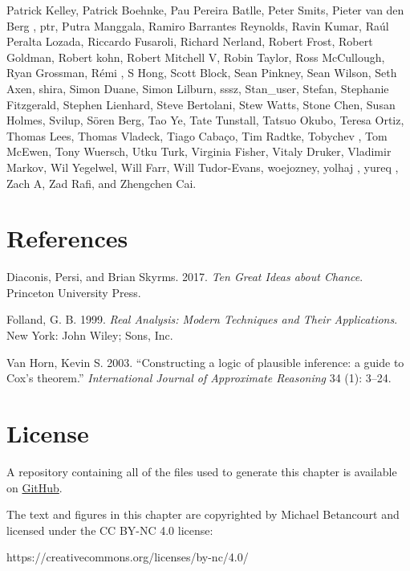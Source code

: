 \documentclass[
  letterpaper,
  DIV=11,
  numbers=noendperiod]{scrartcl}
\newlength{\cslhangindent}
\newlength{\cslentryspacingunit} %
\newenvironment{CSLReferences}[2] %
 {%
  \setlength{\parindent}{0pt}
  \ifodd #1
  \let\oldpar\par
  \def\par{\hangindent=\cslhangindent\oldpar}
  \fi
  \setlength{\parskip}{#2\cslentryspacingunit}
 }%
 {}
\begin{document}
Patrick Kelley, Patrick Boehnke, Pau Pereira Batlle, Peter Smits, Pieter
van den Berg , ptr, Putra Manggala, Ramiro Barrantes Reynolds, Ravin
Kumar, Raúl Peralta Lozada, Riccardo Fusaroli, Richard Nerland, Robert
Frost, Robert Goldman, Robert kohn, Robert Mitchell V, Robin Taylor,
Ross McCullough, Ryan Grossman, Rémi , S Hong, Scott Block, Sean
Pinkney, Sean Wilson, Seth Axen, shira, Simon Duane, Simon Lilburn,
sssz, Stan\_user, Stefan, Stephanie Fitzgerald, Stephen Lienhard, Steve
Bertolani, Stew Watts, Stone Chen, Susan Holmes, Svilup, Sören Berg, Tao
Ye, Tate Tunstall, Tatsuo Okubo, Teresa Ortiz, Thomas Lees, Thomas
Vladeck, Tiago Cabaço, Tim Radtke, Tobychev , Tom McEwen, Tony Wuersch,
Utku Turk, Virginia Fisher, Vitaly Druker, Vladimir Markov, Wil
Yegelwel, Will Farr, Will Tudor-Evans, woejozney, yolhaj , yureq , Zach
A, Zad Rafi, and Zhengchen Cai.

\hypertarget{references}{%
\section*{References}\label{references}}

\hypertarget{refs}{}
\begin{CSLReferences}{1}{0}
\leavevmode{}%
Diaconis, Persi, and Brian Skyrms. 2017. \emph{Ten Great Ideas about
Chance}. Princeton University Press.

\leavevmode{}%
Folland, G. B. 1999. \emph{Real Analysis: Modern Techniques and Their
Applications}. New York: John Wiley; Sons, Inc.

\leavevmode{}%
Van Horn, Kevin S. 2003. {``{Constructing a logic of plausible
inference: a guide to {C}ox's theorem}.''} \emph{{International Journal
of Approximate Reasoning}} 34 (1): 3--24.

\end{CSLReferences}

\hypertarget{license}{%
\section*{License}\label{license}}

A repository containing all of the files used to generate this chapter
is available on
\href{https://github.com/betanalpha/quarto_chapters/tree/main/4_probability_on_general_spaces}{GitHub}.

The text and figures in this chapter are copyrighted by Michael
Betancourt and licensed under the CC BY-NC 4.0 license:

https://creativecommons.org/licenses/by-nc/4.0/
\end{document}
